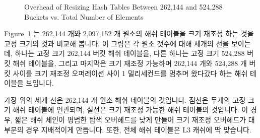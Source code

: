 \begin{figure}[tb]
\centering
{}
\caption{Overhead of Resizing Hash Tables Between 262,144 and 524,288 Buckets vs. Total Number of Elements}
\label{fig:datastruct:Overhead of Resizing Hash Tables Between 262,144 and 524,288 Buckets vs. Total Number of Elements}
\end{figure}

Figure~\ref{fig:datastruct:Overhead of Resizing Hash Tables Between 262,144 and 524,288 Buckets vs. Total Number of Elements}
는 262,144 개와 2,097,152 개 원소의 해쉬 테이블을 크기 재조정 하는 것을 고정
크기의 것과 비교해 봅니다.
이 그림은 각 원소 갯수에 대해 세개의 선을 보이는데, 하나는 고정 크기 262,144
버킷 해쉬 테이블을, 다른 하나는 고정 크기 524,288 버킷 해쉬 테이블을, 그리고
마지막은 크기 재조정 가능하며 262,144 개와 524,288 개 버킷 사이를 크기 재조정
오퍼레이션 사이 1 밀리세컨드를 멈추며 왔다갔다 하는 해쉬 테이블을 보입니다.

가장 위의 세개 선은 262,144 개 원소 해쉬 테이블의 것입니다.
점선은 두개의 고정 크기 해쉬 테이블에 연관되며, 실선은 크기 재조정 가능한 해쉬
테이블의 것입니다.
이 경우, 짧은 해쉬 체인이 평범한 탐색 오버헤드를 낮게 만들어 크기 재조정
오버헤드가 대부분의 경우 지배적이게 만듭니다.
또한, 전체 해쉬 테이블은 L3 캐쉬에 딱 맞습니다.

\iffalse


